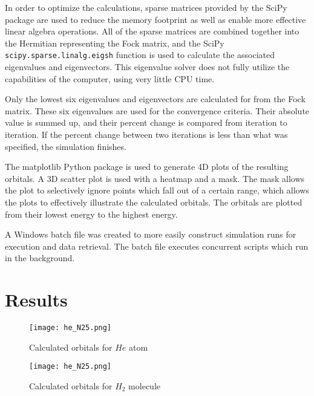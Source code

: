 \documentclass[10pt, oneside, letterpaper]{article}
\begin{document}
In order to optimize the calculations, sparse matrices provided by the SciPy package are used to reduce the memory footprint as well as enable more effective linear algebra operations. All of the sparse matrices are combined together into the Hermitian representing the Fock matrix, and the SciPy \texttt{scipy.sparse.linalg.eigsh} function is used to calculate the associated eigenvalues and eigenvectors. This eigenvalue solver does not fully utilize the capabilities of the computer, using very little CPU time.

Only the lowest six eigenvalues and eigenvectors are calculated for from the Fock matrix. These six eigenvalues are used for the convergence criteria. Their absolute value is summed up, and their percent change is compared from iteration to iteration. If the percent change between two iterations is less than what was specified, the simulation finishes.

The matplotlib Python package is used to generate 4D plots of the resulting orbitals. A 3D scatter plot is used with a heatmap and a mask. The mask allows the plot to selectively ignore points which fall out of a certain range, which allows the plots to effectively illustrate the calculated orbitals. The orbitals are plotted from their lowest energy to the highest energy.

A Windows batch file was created to more easily construct simulation runs for execution and data retrieval. The batch file executes concurrent scripts which run in the background.


\newpage
\section{Results}

\begin{figure}[H]
  \begin{center}
    \texttt{[image: he\_N25.png]}
  \end{center}
  \caption{Calculated orbitals for $He$ atom}
  \label{he-plot}
\end{figure}

\begin{figure}[H]
  \begin{center}
    \texttt{[image: he\_N25.png]}
  \end{center}
  \caption{Calculated orbitals for $H_2$ molecule}
  \label{h2-plot}
\end{figure}
\end{document}
